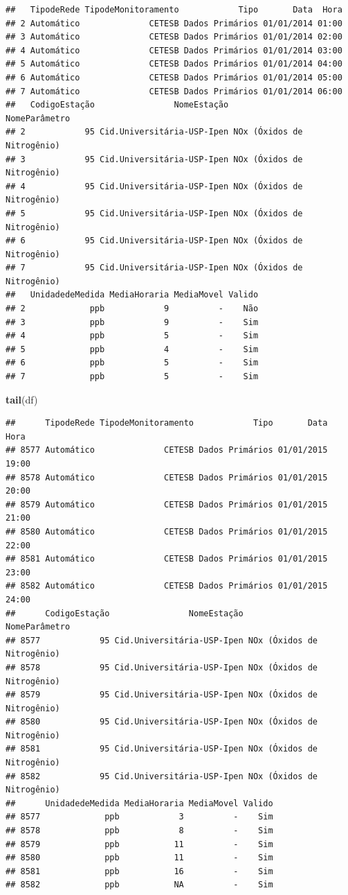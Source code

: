 \documentclass[]{book}
\newenvironment{Shaded}{\begin{snugshade}}{\end{snugshade}}
\newcommand{\KeywordTok}[1]{\textcolor[rgb]{0.13,0.29,0.53}{\textbf{#1}}}
\newcommand{\NormalTok}[1]{#1}
\begin{document}
\begin{verbatim}
##   TipodeRede TipodeMonitoramento            Tipo       Data  Hora
## 2 Automático              CETESB Dados Primários 01/01/2014 01:00
## 3 Automático              CETESB Dados Primários 01/01/2014 02:00
## 4 Automático              CETESB Dados Primários 01/01/2014 03:00
## 5 Automático              CETESB Dados Primários 01/01/2014 04:00
## 6 Automático              CETESB Dados Primários 01/01/2014 05:00
## 7 Automático              CETESB Dados Primários 01/01/2014 06:00
##   CodigoEstação                NomeEstação              NomeParâmetro
## 2            95 Cid.Universitária-USP-Ipen NOx (Óxidos de Nitrogênio)
## 3            95 Cid.Universitária-USP-Ipen NOx (Óxidos de Nitrogênio)
## 4            95 Cid.Universitária-USP-Ipen NOx (Óxidos de Nitrogênio)
## 5            95 Cid.Universitária-USP-Ipen NOx (Óxidos de Nitrogênio)
## 6            95 Cid.Universitária-USP-Ipen NOx (Óxidos de Nitrogênio)
## 7            95 Cid.Universitária-USP-Ipen NOx (Óxidos de Nitrogênio)
##   UnidadedeMedida MediaHoraria MediaMovel Valido
## 2             ppb            9          -    Não
## 3             ppb            9          -    Sim
## 4             ppb            5          -    Sim
## 5             ppb            4          -    Sim
## 6             ppb            5          -    Sim
## 7             ppb            5          -    Sim
\end{verbatim}

\begin{Shaded}
\begin{Highlighting}[]
\KeywordTok{tail}\NormalTok{(df)}
\end{Highlighting}
\end{Shaded}

\begin{verbatim}
##      TipodeRede TipodeMonitoramento            Tipo       Data  Hora
## 8577 Automático              CETESB Dados Primários 01/01/2015 19:00
## 8578 Automático              CETESB Dados Primários 01/01/2015 20:00
## 8579 Automático              CETESB Dados Primários 01/01/2015 21:00
## 8580 Automático              CETESB Dados Primários 01/01/2015 22:00
## 8581 Automático              CETESB Dados Primários 01/01/2015 23:00
## 8582 Automático              CETESB Dados Primários 01/01/2015 24:00
##      CodigoEstação                NomeEstação              NomeParâmetro
## 8577            95 Cid.Universitária-USP-Ipen NOx (Óxidos de Nitrogênio)
## 8578            95 Cid.Universitária-USP-Ipen NOx (Óxidos de Nitrogênio)
## 8579            95 Cid.Universitária-USP-Ipen NOx (Óxidos de Nitrogênio)
## 8580            95 Cid.Universitária-USP-Ipen NOx (Óxidos de Nitrogênio)
## 8581            95 Cid.Universitária-USP-Ipen NOx (Óxidos de Nitrogênio)
## 8582            95 Cid.Universitária-USP-Ipen NOx (Óxidos de Nitrogênio)
##      UnidadedeMedida MediaHoraria MediaMovel Valido
## 8577             ppb            3          -    Sim
## 8578             ppb            8          -    Sim
## 8579             ppb           11          -    Sim
## 8580             ppb           11          -    Sim
## 8581             ppb           16          -    Sim
## 8582             ppb           NA          -    Sim
\end{verbatim}
\end{document}
